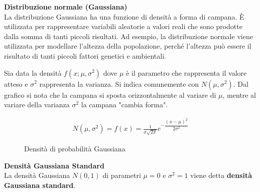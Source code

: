 \begin{defn}
    \textbf{Distribuzione normale (Gaussiana)} \\
    La distribuzione Gaussiana ha una funzione di densità a forma di campana. È
    utilizzata per rappresentare variabili aleatorie a valori reali che sono
    prodotte dalla somma di tanti piccoli risultati. Ad esempio, la
    distribuzione normale viene utilizzata per modellare l'altezza della
    popolazione, perché l'altezza può essere il risultato di tanti piccoli
    fattori genetici e ambientali.

    Sia data la densità $f(x;\mu, \sigma^2)$ dove $\mu$ è il parametro che
    rappresenta il valore atteso e $\sigma^2$ rappresenta la varianza. Si indica
    comunemente con $N(\mu, \sigma^2)$. Dal grafico si nota che la campana si sposta orizzontalmente al
    variare di $\mu$, mentre al variare della varianza $\sigma^2$ la campana
    "cambia forma".

    \begin{equation*}
        \begin{aligned}
            N(\mu, \sigma^2) = f(x) = \frac{1}{\sigma \sqrt{2\pi}} e^{-\dfrac{(x - \mu)^2}{2 \sigma^2}}
        \end{aligned}
    \end{equation*}


    \begin{figure}[htbp!]
        \centering

        \caption{Densità di probabilità Gaussiana}
        \label{gaussian}
    \end{figure}
\end{defn}

\begin{defn}
    \textbf{Densità Gaussiana Standard} \\
    La densità Gaussiana $N(0,1)$ di
    parametri $\mu = 0$ e $\sigma^2 = 1$ viene detta \textbf{densità Gaussiana
    standard}.
\end{defn}



\clearpage


